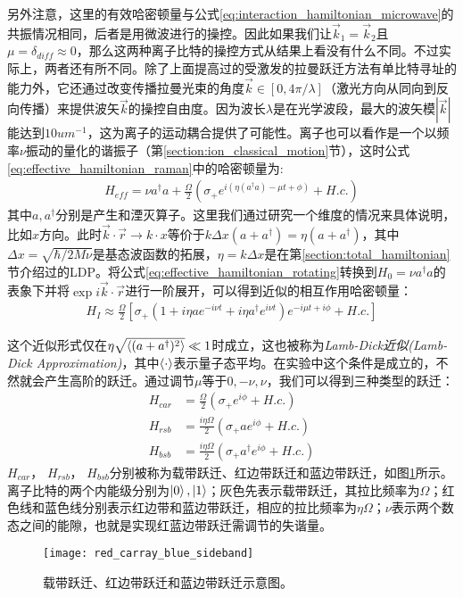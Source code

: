 另外注意，这里的有效哈密顿量与公式\eqref{eq:interaction_hamiltonian_microwave}的共振情况相同，后者是用微波进行的操控。因此如果我们让$\vec{k}_1=\vec{k}_2$且$\mu=\delta_{diff}\approx0$，那么这两种离子比特的操控方式从结果上看没有什么不同。不过实际上，两者还有所不同。除了上面提高过的受激发的拉曼跃迁方法有单比特寻址的能力外，它还通过改变传播拉曼光束的角度$\vec{k}\in[0,4\pi/\lambda]$（激光方向从同向到反向传播）来提供波矢$\vec{k}$的操控自由度。因为波长$\lambda$是在光学波段，最大的波矢模$|\vec{k}|$能达到$10um^{-1}$，这为离子的运动耦合提供了可能性。离子也可以看作是一个以频率$\nu$振动的量化的谐振子（第\ref{section:ion_classical_motion}节），这时公式\eqref{eq:effective_hamiltonian_raman}中的哈密顿量为:
\begin{align}
    H_{eff}=\nu a^\dagger a+\frac{\Omega}{2}\left(\sigma_+e^{i(\eta(a^\dagger a)-\mu t+\phi)}+H.c.\right) \label{eq:effective_hamiltonian_rotating}
\end{align}
其中$a,a^\dagger$分别是产生和湮灭算子。这里我们通过研究一个维度的情况来具体说明，比如$x$方向。此时$\vec{k}\cdot\vec{r}\to k\cdot x$等价于$k\Delta x(a+a^\dagger)=\eta(a+a^\dagger)$，其中$\Delta x=\sqrt{\hbar/2M\nu}$是基态波函数的拓展，$\eta=k\Delta x$是在第\ref{section:total_hamiltonian}节介绍过的LDP。将公式\eqref{eq:effective_hamiltonian_rotating}转换到$H_0=\nu a^\dagger a$的表象下并将$\exp{i\vec{k}\cdot \vec{r}}$进行一阶展开，可以得到近似的相互作用哈密顿量：
\begin{align}
    H_I\approx\frac{\Omega}{2}\left[\sigma_+(1+i\eta a e^{-i\nu t}+i\eta a^\dagger e^{i\nu t})e^{-i\mu t+i\phi}+H.c.\right]
\end{align}

这个近似形式仅在$\eta\sqrt{\braket{(a+a^\dagger)^2}}\ll1$时成立，这也被称为\emph{Lamb-Dick近似(Lamb-Dick Approximation)}，其中$\braket{\cdot}$表示量子态平均。在实验中这个条件是成立的，不然就会产生高阶的跃迁。通过调节$\mu$等于$0,-\nu,\nu$，我们可以得到三种类型的跃迁：
\begin{align}
    H_{car}&=\frac{\Omega}{2}(\sigma_+e^{i\phi}+H.c.)\\
    H_{rsb}&=\frac{i\eta\Omega}{2}(\sigma_+ae^{i\phi}+H.c.)\\
    H_{bsb}&=\frac{i\eta\Omega}{2}(\sigma_+a^\dagger e^{i\phi}+H.c.)
\end{align}
$H_{car}$， $H_{rsb}$， $H_{bsb}$分别被称为载带跃迁、红边带跃迁和蓝边带跃迁，如图\ref{fig:red_carray_blue_sideband}所示。离子比特的两个内能级分别为$\ket{0},\ket{1}$；灰色先表示载带跃迁，其拉比频率为$\Omega$；红色线和蓝色线分别表示红边带和蓝边带跃迁，相应的拉比频率为$\eta \Omega$；$\nu$表示两个数态之间的能隙，也就是实现红蓝边带跃迁需调节的失谐量。
\begin{figure}
    \centering
    \caption[载带跃迁、红边带跃迁和蓝边带跃迁示意图]{载带跃迁、红边带跃迁和蓝边带跃迁示意图。\label{fig:red_carray_blue_sideband}}
    \texttt{[image: red\_carray\_blue\_sideband]}
\end{figure}

